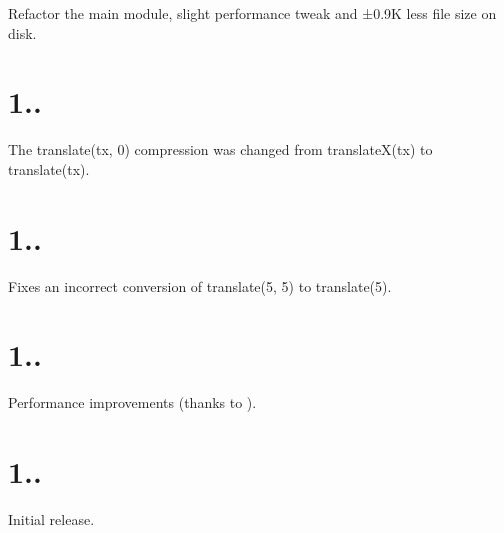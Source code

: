 
\begin{DoxyItemize}
\item Refactor the main module, slight performance tweak and ±0.9K less file size on disk.
\end{DoxyItemize}

\section*{1..}


\begin{DoxyItemize}
\item The {\ttfamily translate(tx, 0)} compression was changed from {\ttfamily translate\+X(tx)} to {\ttfamily translate(tx)}.
\end{DoxyItemize}

\section*{1..}


\begin{DoxyItemize}
\item Fixes an incorrect conversion of {\ttfamily translate(5, 5)} to {\ttfamily translate(5)}.
\end{DoxyItemize}

\section*{1..}


\begin{DoxyItemize}
\item Performance improvements (thanks to ).
\end{DoxyItemize}

\section*{1..}


\begin{DoxyItemize}
\item Initial release. 
\end{DoxyItemize}